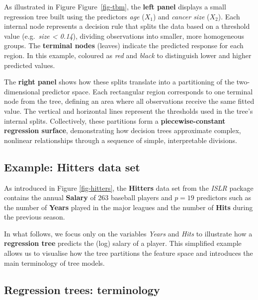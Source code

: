 \documentclass[
  letterpaper,
  DIV=11,
  numbers=noendperiod]{scrartcl}
\begin{document}
As illustrated in Figure Figure~\ref{fig-tbm}, the \textbf{left panel}
displays a small regression tree built using the predictors \emph{age}
(\(X_1\)) and \emph{cancer size} (\(X_2\)). Each internal node
represents a decision rule that splits the data based on a threshold
value (e.g.~\emph{size \textless{} 0.14}), dividing observations into
smaller, more homogeneous groups. The \textbf{terminal nodes} (leaves)
indicate the predicted response for each region. In this example,
coloured as \emph{red} and \emph{black} to distinguish lower and higher
predicted values.

The \textbf{right panel} shows how these splits translate into a
partitioning of the two-dimensional predictor space. Each rectangular
region corresponds to one terminal node from the tree, defining an area
where all observations receive the same fitted value. The vertical and
horizontal lines represent the thresholds used in the tree's internal
splits. Collectively, these partitions form a \textbf{piecewise-constant
regression surface}, demonstrating how decision trees approximate
complex, nonlinear relationships through a sequence of simple,
interpretable divisions.

\subsection{Example: Hitters data set}\label{example-hitters-data-set-1}

As introduced in Figure \ref{fig-hitters}, the \textbf{Hitters} data set
from the \emph{ISLR} package contains the annual \textbf{Salary} of 263
baseball players and \(p = 19\) predictors such as the number of
\textbf{Years} played in the major leagues and the number of
\textbf{Hits} during the previous season.

In what follows, we focus only on the variables \emph{Years} and
\emph{Hits} to illustrate how a \textbf{regression tree} predicts the
(log) salary of a player. This simplified example allows us to visualise
how the tree partitions the feature space and introduces the main
terminology of tree models.

\subsection{Regression trees:
terminology}\label{regression-trees-terminology}
\end{document}
